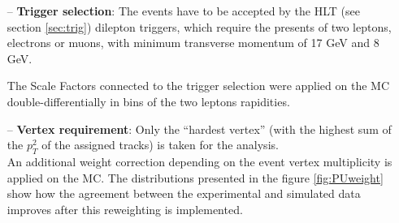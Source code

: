 \begin{itemize}
 \item [--] \textbf{Trigger selection}: The events have to be accepted by the HLT (see section \ref{sec:trig}) dilepton triggers, which require the presents of two leptons, electrons or muons, with
 minimum transverse momentum of 17 GeV and 8 GeV.
 
 The Scale Factors connected to the trigger selection were applied on the MC double-differentially in bins of the two leptons rapidities. 
 \item [--] \textbf{Vertex requirement}: Only the ``hardest vertex'' (with the highest sum of the $p_{T}^{2}$ of the assigned tracks) is taken for the analysis. 
 \\
 An additional weight correction depending on the event vertex multiplicity is applied on the MC. 
 The distributions presented in the figure \ref{fig:PUweight} show how the agreement
 between the experimental and simulated data improves after this reweighting is implemented.
 

\end{itemize}
